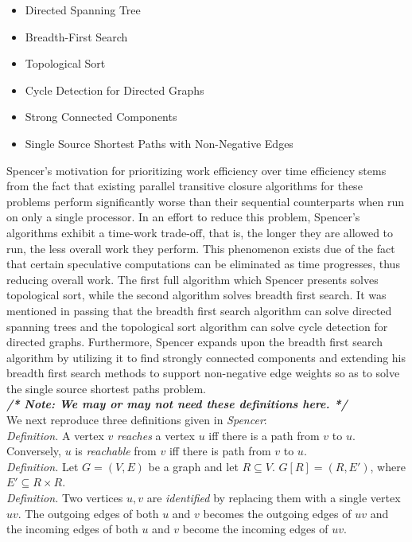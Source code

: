 \documentclass[paper=a4, fontsize=11pt]{scrartcl} %
\numberwithin{equation}{section} %
\numberwithin{figure}{section} %
\numberwithin{table}{section} %
\begin{document}
\begin{itemize}
\item Directed Spanning Tree
\item Breadth-First Search
\item Topological Sort
\item Cycle Detection for Directed Graphs
\item Strong Connected Components
\item Single Source Shortest Paths with Non-Negative Edges
\end{itemize}

Spencer's motivation for prioritizing work efficiency over time efficiency stems from the fact that existing parallel transitive closure algorithms for these problems perform significantly worse than their sequential counterparts when run on only a single processor. In an effort to reduce this problem, Spencer's algorithms exhibit a time-work trade-off, that is, the longer they are allowed to run, the less overall work they perform. This phenomenon exists due of the fact that certain speculative computations can be eliminated as time progresses, thus reducing overall work. The first full algorithm which Spencer presents solves topological sort, while the second algorithm solves breadth first search. It was mentioned in passing that the breadth first search algorithm can solve directed spanning trees and the topological sort algorithm can solve cycle detection for directed graphs. Furthermore, Spencer expands upon the breadth first search algorithm  by utilizing it to find strongly connected components and extending his breadth first search methods to support non-negative edge weights so as to solve the single source shortest paths problem.\\ 

\textbf{\textit{/* Note: We may or may not need these definitions here. */}}\\
We next reproduce three definitions given in \textit{Spencer\cite{S97}}:\\

\textit{Definition.} A vertex $v$ \textit{reaches} a vertex $u$ iff there is a path from $v$ to $u$. Conversely, $u$ is \textit{reachable} from $v$ iff there is path from $v$ to $u$.\\

\textit{Definition.} Let $G = (V, E)$ be a graph and let $R \subseteq V$. $G[R] = (R, E')$, where $E' \subseteq R \times R$.\\

\textit{Definition.} Two vertices $u,v$ are \textit{identified} by replacing them with a single vertex $uv$. The outgoing edges of both $u$ and $v$ becomes the outgoing edges of $uv$ and the incoming edges of both $u$ and $v$ become the incoming edges of $uv$.
\end{document}
